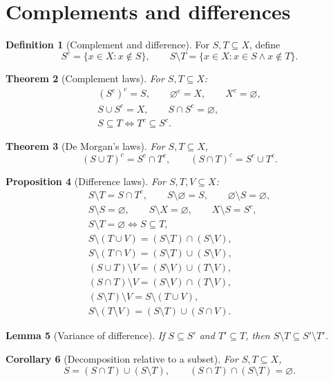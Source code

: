 \documentclass[11pt]{article}
\newtheorem{theorem}{Theorem}[section]
\newtheorem{lemma}[theorem]{Lemma}
\newtheorem{proposition}[theorem]{Proposition}
\newtheorem{corollary}[theorem]{Corollary}
\theoremstyle{definition}
\newtheorem{definition}[theorem]{Definition}
\begin{document}
\section{Complements and differences}
\begin{definition}[Complement and difference]
For $S,T\subseteq X$, define
\[
S^c=\{x\in X:x\notin S\},\qquad
S\setminus T=\{x\in X:x\in S\land x\notin T\}.
\]
\end{definition}
\begin{theorem}[Complement laws]
For $S,T\subseteq X$:
\begin{gather*}
(S^c)^c=S,\qquad \varnothing^c=X,\qquad X^c=\varnothing,\\
S\cup S^c=X,\qquad S\cap S^c=\varnothing,\\
S\subseteq T\iff T^c\subseteq S^c.
\end{gather*}
\end{theorem}
\begin{theorem}[De Morgan's laws]
For $S,T\subseteq X$,
\[
(S\cup T)^c=S^c\cap T^c,\qquad
(S\cap T)^c=S^c\cup T^c.
\]
\end{theorem}
\begin{proposition}[Difference laws]
For $S,T,V\subseteq X$:
\begin{gather*}
S\setminus T=S\cap T^c,\qquad
S\setminus\varnothing=S,\qquad \varnothing\setminus S=\varnothing,\\
S\setminus S=\varnothing,\qquad S\setminus X=\varnothing,\qquad
X\setminus S=S^c,\\
S\setminus T=\varnothing\iff S\subseteq T,\\
S\setminus(T\cup V)=(S\setminus T)\cap(S\setminus V),\\
S\setminus(T\cap V)=(S\setminus T)\cup(S\setminus V),\\
(S\cup T)\setminus V=(S\setminus V)\cup(T\setminus V),\\
(S\cap T)\setminus V=(S\setminus V)\cap(T\setminus V),\\
(S\setminus T)\setminus V=S\setminus(T\cup V),\\
S\setminus(T\setminus V)=(S\setminus T)\cup(S\cap V).
\end{gather*}
\end{proposition}
\begin{lemma}[Variance of difference]
If $S\subseteq S'$ and $T'\subseteq T$, then
$S\setminus T\subseteq S'\setminus T'$.
\end{lemma}
\begin{corollary}[Decomposition relative to a subset]
For $S,T\subseteq X$,
\[
S=(S\cap T)\cup(S\setminus T),\qquad
(S\cap T)\cap(S\setminus T)=\varnothing.
\]
\end{corollary}
\end{document}
